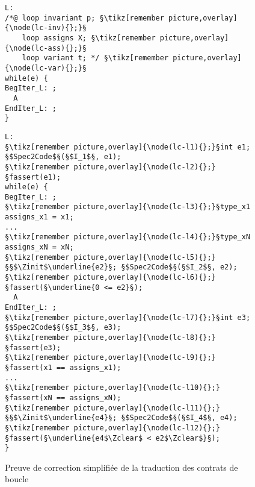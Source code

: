\begin{figure}[bt]
  \begin{minipage}{0.65\textwidth}
    \begin{lstlisting}[escapechar=§]
L:
/*@ loop invariant p; §\tikz[remember picture,overlay]{\node(lc-inv){};}§
    loop assigns X; §\tikz[remember picture,overlay]{\node(lc-ass){};}§
    loop variant t; */ §\tikz[remember picture,overlay]{\node(lc-var){};}§
while(e) {
BegIter_L: ;
  A
EndIter_L: ;
}
    \end{lstlisting}
  \end{minipage}\hfill
  \begin{minipage}{0.49\textwidth}
    \begin{lstlisting}[escapechar=§]
L:
§\tikz[remember picture,overlay]{\node(lc-l1){};}§int e1; §$Spec2Code$§(§$I_1$§, e1);
§\tikz[remember picture,overlay]{\node(lc-l2){};}§fassert(e1);
while(e) {
BegIter_L: ;
§\tikz[remember picture,overlay]{\node(lc-l3){};}§type_x1 assigns_x1 = x1;
...
§\tikz[remember picture,overlay]{\node(lc-l4){};}§type_xN assigns_xN = xN;
§\tikz[remember picture,overlay]{\node(lc-l5){};}§§$\Zinit$\underline{e2}§; §$Spec2Code$§(§$I_2$§, e2);
§\tikz[remember picture,overlay]{\node(lc-l6){};}§fassert(§\underline{0 <= e2}§);
  A
EndIter_L: ;
§\tikz[remember picture,overlay]{\node(lc-l7){};}§int e3; §$Spec2Code$§(§$I_3$§, e3);
§\tikz[remember picture,overlay]{\node(lc-l8){};}§fassert(e3);
§\tikz[remember picture,overlay]{\node(lc-l9){};}§fassert(x1 == assigns_x1);
...
§\tikz[remember picture,overlay]{\node(lc-l10){};}§fassert(xN == assigns_xN);
§\tikz[remember picture,overlay]{\node(lc-l11){};}§§$\Zinit$\underline{e4}§; §$Spec2Code$§(§$I_4$§, e4);
§\tikz[remember picture,overlay]{\node(lc-l12){};}§fassert(§\underline{e4$\Zclear$ < e2$\Zclear$}§);
}
    \end{lstlisting}
  \end{minipage}
  \caption{Preuve de correction simplifiée de la traduction des contrats de
    boucle}
  \label{fig:proof-loop-contract}
\end{figure}
